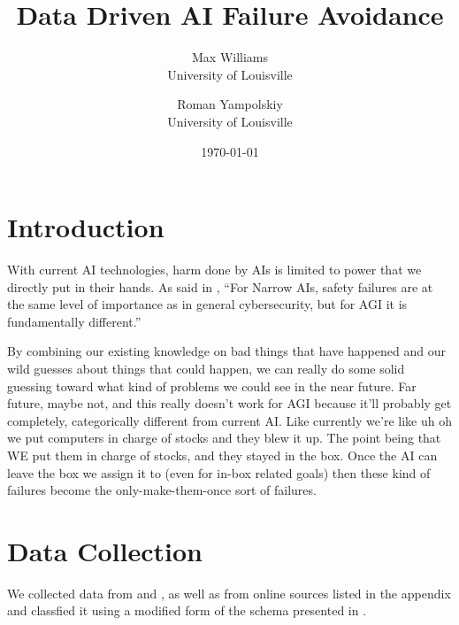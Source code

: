 \documentclass[11pt]{article}
\begin{document}
\title{Data Driven AI Failure Avoidance}
\author{Max Williams \\ University of Louisville \and Roman Yampolskiy \\ University of Louisville}
\date{\today}
\maketitle


\section{Introduction}

With current AI technologies, harm done by AIs is limited to power that we directly put in their
hands.  As said in \cite{yam2018timeline}, ``For Narrow AIs, safety failures are at the same level
of importance as in general cybersecurity, but for AGI it is fundamentally different.'' 

By combining
our existing knowledge on bad things that have happened and our wild guesses about things that
could happen, we can really do some solid guessing toward what kind of problems we could see in the
near future. Far future, maybe not, and this really doesn't work for AGI because it'll probably get
completely, categorically different from current AI. Like currently we're like uh oh we put
computers in charge of stocks and they blew it up. The point being that WE put them in charge of
stocks, and they stayed in the box. Once the AI can leave the box we assign it to (even for in-box
related goals) then these kind of failures become the only-make-them-once sort of failures. 

\section{Data Collection}

We collected data from \cite{yam2018timeline} and \cite{yam2019classification}, as well as from
online sources listed in the appendix and classfied it using a modified form of the schema presented
in \cite{yam2019classification}. 
\end{document}
